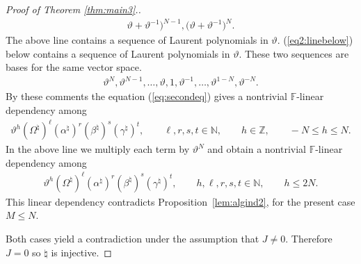 \begin{proof}[Proof of Theorem \ref{thm:main3}.]
\begin{gather*}
\vartheta
+
\vartheta^{-1}\big)^{N-1},
\big(
\vartheta
+
\vartheta^{-1}\big)^N.
\end{gather*}
The above line
contains a sequence of
Laurent polynomials in $\vartheta$.
(\ref{eq2:linebelow})
below contains a sequence of
Laurent polynomials in $\vartheta$.
These two sequences are bases for the same vector space.
\begin{gather}
\label{eq2:linebelow}
\vartheta^N,  \vartheta^{N-1},  \ldots,  \vartheta,   1,
 \vartheta^{-1},
 \ldots,
 \vartheta^{1-N},
 \vartheta^{-N}.
\end{gather}
By these comments the  equation
(\ref{eq:secondeq})
gives a
 nontrivial $\mathbb F$-linear dependency
among
\begin{gather*}
\vartheta^h
(\Omega^\natural)^\ell (\alpha^\natural)^r (\beta^\natural)^s
(\gamma^\natural)^t,
 \qquad \ell, r,s,t \in \mathbb N, \qquad
h \in \mathbb Z, \qquad   -N \leq h \leq N.
\end{gather*}
In the above line we multiply each term by $\vartheta^N$ and
obtain
a nontrivial $\mathbb F$-linear dependency among
\begin{gather*}
\vartheta^h
(\Omega^\natural)^\ell (\alpha^\natural)^r
(\beta^\natural)^s (\gamma^\natural)^t
, \qquad h,\ell, r,s,t \in \mathbb N , \qquad
 h \leq 2N.
\end{gather*}
This linear dependency
contradicts
Proposition~\ref{lem:algind2},
for the present case
 $M\leq N$.


Both cases yield a contradiction
under the assumption
that $J\not=0$.
Therefore $J=0$ so $\natural$ is injective.
\end{proof}
